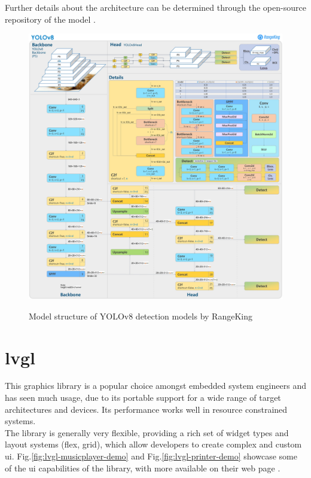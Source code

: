 \documentclass[Bachelor, BIC, english, fhCitStyle, IEEE]{BASE/twbook} %
\newcommand{\nocontentsline}[3]{}
\newcommand{\hidsection}[1]{\bgroup\let\addcontentsline=\nocontentsline\section{#1}\egroup}
\begin{document}
Further details about the architecture can be determined through the open-source repository of the model \autocite{jocherUltralyticsYOLO2023}.
\begin{figure}
    \caption{Model structure of YOLOv8 detection models by RangeKing \autocite{BriefSummaryYOLOv8}}
    \centering
    \includegraphics[width=\textwidth]{yolov8_model_architecture.jpg}
    \label{fig:yolov8-model-architecture}
\end{figure}
\clearpage
\hidsection{\acf{lvgl}}
This graphics library \autocite{LVGLLightVersatile} is a popular choice amongst embedded system engineers and has seen much usage, due to its portable support for a wide range of target architectures and devices. Its performance works well in resource constrained systems.\\
The library is generally very flexible, providing a rich set of widget types \autocite{WidgetsLVGLDocumentation} and layout systems (flex, grid), which allow developers to create complex and custom \ac{ui}. Fig.\ref{fig:lvgl-musicplayer-demo} and Fig.\ref{fig:lvgl-printer-demo} showcase some of the \ac{ui} capabilities of the library, with more available on their web page \autocite{llcLiveDemosTest}.\\
\end{document}
